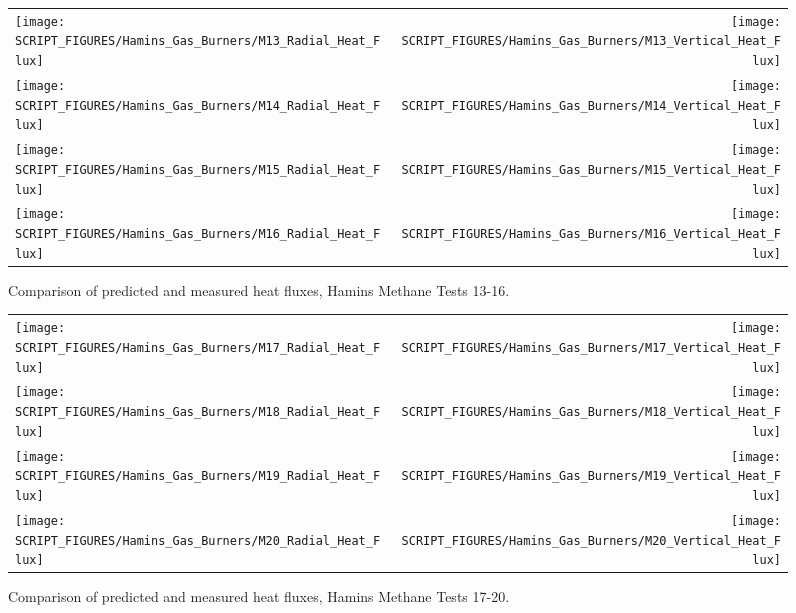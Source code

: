 \begin{figure}[p]
\begin{tabular*}{\textwidth}{l@{\extracolsep{\fill}}r}
\texttt{[image: SCRIPT\_FIGURES/Hamins\_Gas\_Burners/M13\_Radial\_Heat\_Flux]} &
\texttt{[image: SCRIPT\_FIGURES/Hamins\_Gas\_Burners/M13\_Vertical\_Heat\_Flux]} \\
\texttt{[image: SCRIPT\_FIGURES/Hamins\_Gas\_Burners/M14\_Radial\_Heat\_Flux]} &
\texttt{[image: SCRIPT\_FIGURES/Hamins\_Gas\_Burners/M14\_Vertical\_Heat\_Flux]} \\
\texttt{[image: SCRIPT\_FIGURES/Hamins\_Gas\_Burners/M15\_Radial\_Heat\_Flux]} &
\texttt{[image: SCRIPT\_FIGURES/Hamins\_Gas\_Burners/M15\_Vertical\_Heat\_Flux]} \\
\texttt{[image: SCRIPT\_FIGURES/Hamins\_Gas\_Burners/M16\_Radial\_Heat\_Flux]} &
\texttt{[image: SCRIPT\_FIGURES/Hamins\_Gas\_Burners/M16\_Vertical\_Heat\_Flux]}
\end{tabular*}
\label{Hamins_Methane_13-16}
\caption[Heat flux predictions, Hamins methane burner Tests 13-16]
{Comparison of predicted and measured heat fluxes, Hamins Methane Tests 13-16.}
\end{figure}

\begin{figure}[p]
\begin{tabular*}{\textwidth}{l@{\extracolsep{\fill}}r}
\texttt{[image: SCRIPT\_FIGURES/Hamins\_Gas\_Burners/M17\_Radial\_Heat\_Flux]} &
\texttt{[image: SCRIPT\_FIGURES/Hamins\_Gas\_Burners/M17\_Vertical\_Heat\_Flux]} \\
\texttt{[image: SCRIPT\_FIGURES/Hamins\_Gas\_Burners/M18\_Radial\_Heat\_Flux]} &
\texttt{[image: SCRIPT\_FIGURES/Hamins\_Gas\_Burners/M18\_Vertical\_Heat\_Flux]} \\
\texttt{[image: SCRIPT\_FIGURES/Hamins\_Gas\_Burners/M19\_Radial\_Heat\_Flux]} &
\texttt{[image: SCRIPT\_FIGURES/Hamins\_Gas\_Burners/M19\_Vertical\_Heat\_Flux]} \\
\texttt{[image: SCRIPT\_FIGURES/Hamins\_Gas\_Burners/M20\_Radial\_Heat\_Flux]} &
\texttt{[image: SCRIPT\_FIGURES/Hamins\_Gas\_Burners/M20\_Vertical\_Heat\_Flux]}
\end{tabular*}
\label{Hamins_Methane_17-20}
\caption[Heat flux predictions, Hamins methane burner Tests 17-20]
{Comparison of predicted and measured heat fluxes, Hamins Methane Tests 17-20.}
\end{figure}

